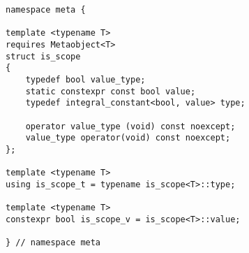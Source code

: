
\begin{verbatim}
namespace meta {

template <typename T>
requires Metaobject<T>
struct is_scope
{
	typedef bool value_type;
	static constexpr const bool value;
	typedef integral_constant<bool, value> type;

	operator value_type (void) const noexcept;
	value_type operator(void) const noexcept;
};

template <typename T>
using is_scope_t = typename is_scope<T>::type;

template <typename T>
constexpr bool is_scope_v = is_scope<T>::value;

} // namespace meta
\end{verbatim}
